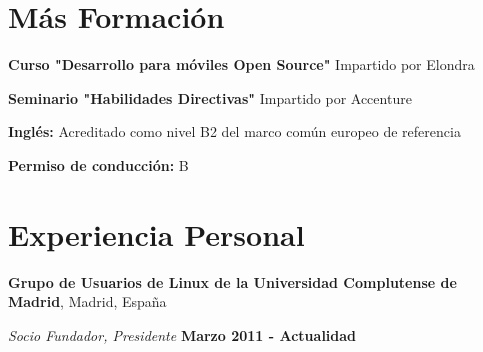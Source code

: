 \documentclass[margin,line]{resume}
\begin{document}
\begin{resume}
\section{\sc Más Formación } 
\begin{list1}
\item[] {\bf Curso "Desarrollo para móviles Open Source"} Impartido por Elondra
\item[] {\bf Seminario "Habilidades Directivas"} Impartido por Accenture
\item[] {\bf Inglés:} Acreditado como nivel B2 del marco común europeo de referencia
\item[] {\bf Permiso de conducción:} B
\end{list1}


\section{\sc Experiencia Personal}
{\bf Grupo de Usuarios de Linux de la Universidad Complutense de
Madrid}, Madrid, España

\vspace{-.3cm}
{\em Socio Fundador, Presidente} \hfill {\bf Marzo 2011 - Actualidad}






%

\end{resume}
\end{document}
